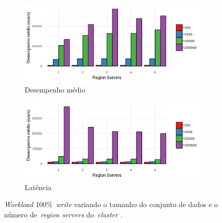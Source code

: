 \documentclass[12pt]{article}
\begin{document}
\begin{figure}[!ht]
    \centering
    \begin{subfigure}[b]{0.49\textwidth}
        \centering
        \includegraphics[width=\textwidth]{images/figura15}
        \caption{Desempenho médio}
        \label{figura15}
    \end{subfigure}
        \hfill
    \begin{subfigure}[b]{0.49\textwidth}  
        \centering 
        \includegraphics[width=\textwidth]{images/figura16}
        \caption{Latência}
        \label{figura16}
    \end{subfigure}
    \caption{\emph{Workload} 100\%~\emph{write} variando o tamanho do conjunto de dados e o número de~\emph{region servers} do~\emph{cluster} .}
\end{figure}
\end{document}
